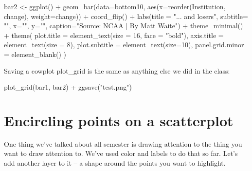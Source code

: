 \documentclass[
]{book}
\newenvironment{Shaded}{\begin{snugshade}}{\end{snugshade}}
\newcommand{\AttributeTok}[1]{\textcolor[rgb]{0.77,0.63,0.00}{#1}}
\newcommand{\DecValTok}[1]{\textcolor[rgb]{0.00,0.00,0.81}{#1}}
\newcommand{\FunctionTok}[1]{\textcolor[rgb]{0.00,0.00,0.00}{#1}}
\newcommand{\NormalTok}[1]{#1}
\newcommand{\OtherTok}[1]{\textcolor[rgb]{0.56,0.35,0.01}{#1}}
\newcommand{\SpecialCharTok}[1]{\textcolor[rgb]{0.00,0.00,0.00}{#1}}
\newcommand{\StringTok}[1]{\textcolor[rgb]{0.31,0.60,0.02}{#1}}
\begin{document}
\begin{Shaded}
\begin{Highlighting}[]
\NormalTok{bar2 }\OtherTok{\textless{}{-}} \FunctionTok{ggplot}\NormalTok{() }\SpecialCharTok{+} \FunctionTok{geom\_bar}\NormalTok{(}\AttributeTok{data=}\NormalTok{bottom10, }\FunctionTok{aes}\NormalTok{(}\AttributeTok{x=}\FunctionTok{reorder}\NormalTok{(Institution, change), }\AttributeTok{weight=}\NormalTok{change)) }\SpecialCharTok{+} \FunctionTok{coord\_flip}\NormalTok{() }\SpecialCharTok{+}  \FunctionTok{labs}\NormalTok{(}\AttributeTok{title =} \StringTok{"... and losers"}\NormalTok{, }\AttributeTok{subtitle=} \StringTok{""}\NormalTok{, }\AttributeTok{x=}\StringTok{""}\NormalTok{, }\AttributeTok{y=}\StringTok{""}\NormalTok{,  }\AttributeTok{caption=}\StringTok{"Source: NCAA | By Matt Waite"}\NormalTok{) }\SpecialCharTok{+} \FunctionTok{theme\_minimal}\NormalTok{() }\SpecialCharTok{+} 
  \FunctionTok{theme}\NormalTok{(}
    \AttributeTok{plot.title =} \FunctionTok{element\_text}\NormalTok{(}\AttributeTok{size =} \DecValTok{16}\NormalTok{, }\AttributeTok{face =} \StringTok{"bold"}\NormalTok{),}
    \AttributeTok{axis.title =} \FunctionTok{element\_text}\NormalTok{(}\AttributeTok{size =} \DecValTok{8}\NormalTok{), }
    \AttributeTok{plot.subtitle =} \FunctionTok{element\_text}\NormalTok{(}\AttributeTok{size=}\DecValTok{10}\NormalTok{), }
    \AttributeTok{panel.grid.minor =} \FunctionTok{element\_blank}\NormalTok{()}
\NormalTok{    )}
\end{Highlighting}
\end{Shaded}

Saving a cowplot plot\_grid is the same as anything else we did in the class:

\begin{Shaded}
\begin{Highlighting}[]
\FunctionTok{plot\_grid}\NormalTok{(bar1, bar2) }\SpecialCharTok{+} \FunctionTok{ggsave}\NormalTok{(}\StringTok{"test.png"}\NormalTok{)}
\end{Highlighting}
\end{Shaded}

\hypertarget{encircling-points-on-a-scatterplot}{%
\chapter{Encircling points on a scatterplot}\label{encircling-points-on-a-scatterplot}}

One thing we've talked about all semester is drawing attention to the thing you want to draw attention to. We've used color and labels to do that so far. Let's add another layer to it -- a shape around the points you want to highlight.
\end{document}
